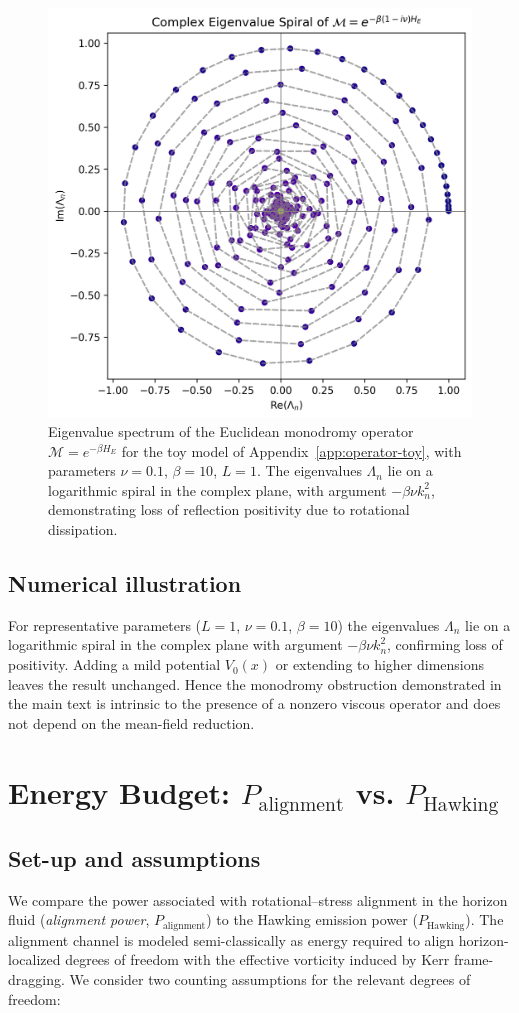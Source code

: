 \documentclass[11pt]{article}
\begin{document}
\begin{figure}[h!]
    \centering
    \includegraphics[width=0.6\linewidth]{monodromy_spiral.png}
    \caption{Eigenvalue spectrum of the Euclidean monodromy operator 
    $\mathcal{M} = e^{-\beta H_E}$ for the toy model of 
    Appendix~\ref{app:operator-toy}, with parameters 
    $\nu = 0.1$, $\beta = 10$, $L = 1$. 
    The eigenvalues $\Lambda_n$ lie on a logarithmic spiral 
    in the complex plane, with argument $-\beta\nu k_n^2$, 
    demonstrating loss of reflection positivity 
    due to rotational dissipation.}
    \label{fig:monodromy_spiral}
\end{figure}

\subsection*{Numerical illustration}
For representative parameters ($L\!=\!1$, $\nu\!=\!0.1$, $\beta\!=\!10$) the eigenvalues $\Lambda_n$ lie on a logarithmic spiral in the complex plane with argument $-\beta\nu k_n^2$, confirming loss of positivity.
Adding a mild potential $V_0(x)$ or extending to higher dimensions leaves the result unchanged.
Hence the monodromy obstruction demonstrated in the main text is intrinsic to the presence of a nonzero viscous operator and does not depend on the mean-field reduction.

\section{Energy Budget: \texorpdfstring{$P_{\text{alignment}}$}{Palignment} vs. \texorpdfstring{$P_{\text{Hawking}}$}{PHawking}}
\label{app:energy-budget}

\subsection*{Set-up and assumptions}
We compare the power associated with rotational–stress alignment in the horizon fluid
(\emph{alignment power}, $P_{\text{alignment}}$) to the Hawking emission power ($P_{\text{Hawking}}$).
The alignment channel is modeled semi-classically as energy required to align
horizon-localized degrees of freedom with the effective vorticity induced by Kerr
frame-dragging. We consider two counting assumptions for the relevant degrees of freedom:
\end{document}
